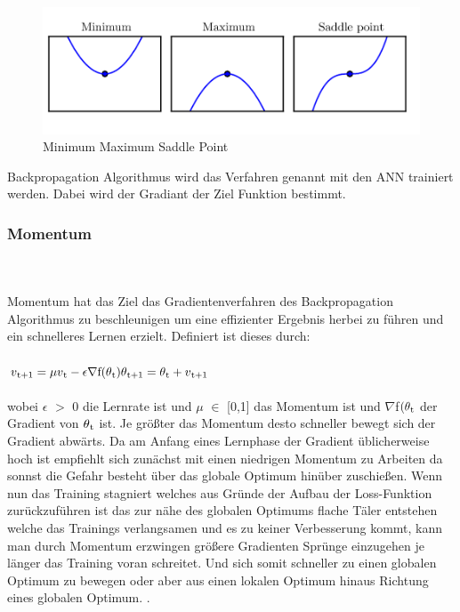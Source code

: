 \documentclass{llncs}
\begin{document}
	\begin{figure}[htbp] 
		\centering
		\includegraphics[width=1.0\textwidth]{saddle.png}
		\caption{Minimum Maximum Saddle Point}
		\label{fig:Bild5}
	\end{figure}
	Backpropagation Algorithmus wird das Verfahren genannt mit den ANN trainiert werden. Dabei wird der Gradiant der Ziel Funktion bestimmt.
	\newpage
	\subsubsection{Momentum}
	~\\\\
	Momentum hat das Ziel das Gradientenverfahren des Backpropagation Algorithmus zu beschleunigen um eine effizienter Ergebnis herbei zu führen und ein schnelleres Lernen erzielt. Definiert ist dieses durch:
	\\\\
	\begin{math}
	v\textsubscript{t+1} =\mu v\textsubscript{t}-\epsilon\nabla$f$(\theta\textsubscript{t})
	\theta\textsubscript{t+1}= \theta\textsubscript{t}+v\textsubscript{t+1}
	\\\
	\end{math}
	\\\\
	wobei $\epsilon$ $>$ 0 die Lernrate ist und $\mu$ $\in$ [0,1] das Momentum ist und $\nabla$f$(\theta\textsubscript{t}$ der Gradient von $\theta\textsubscript{t}$ ist. Je größter das Momentum desto schneller bewegt sich der Gradient abwärts. Da am Anfang eines Lernphase der Gradient üblicherweise hoch ist empfiehlt sich zunächst mit einen niedrigen Momentum zu Arbeiten da sonnst die Gefahr besteht über das globale Optimum hinüber zuschießen. Wenn nun das Training stagniert welches aus Gründe der Aufbau der Loss-Funktion zurückzuführen ist das zur nähe des globalen Optimums flache Täler entstehen welche das Trainings verlangsamen und es zu keiner Verbesserung kommt, kann man durch Momentum erzwingen größere Gradienten Sprünge einzugehen  je länger das Training voran schreitet. Und sich somit schneller zu einen globalen Optimum zu bewegen oder aber aus einen lokalen Optimum hinaus Richtung eines globalen Optimum\cite{momentum}. .
	
\end{document}
